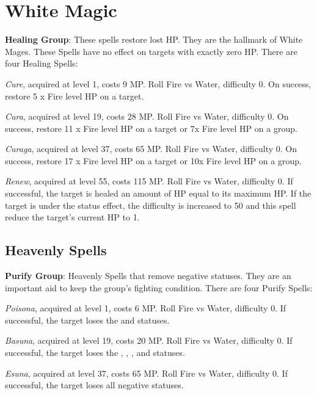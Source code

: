 \section{White Magic}\label{sec:magic-white}

\begin{multicols}{2}
	
    \textbf{Healing Group}: These spells restore lost HP\@. They are the hallmark of White Mages. These Spells have no effect on targets with exactly zero HP\@. There are four Healing Spells:

    \textit{Cure}, acquired at level 1, costs 9 MP\@. Roll Fire vs Water, difficulty 0. On success, restore 5 x Fire level HP on a target.

    \textit{Cura}, acquired at level 19, costs 28 MP\@. Roll Fire vs Water, difficulty 0. On success, restore 11 x Fire level HP on a target or 7x Fire level HP on a group.

    \textit{Curaga}, acquired at level 37, costs 65 MP\@. Roll Fire vs Water, difficulty 0. On success, restore 17 x Fire level HP on a target or 10x Fire level HP on a group.

    \textit{Renew}, acquired at level 55, costs 115 MP\@. Roll Fire vs Water, difficulty 0. If successful, the target is healed an amount of HP equal to its maximum HP\@. If the target is under the  status effect, the difficulty is increased to 50 and this spell reduce the target’s current HP to 1.\\%

    \subsection{Heavenly Spells}\label{subsec:white-heavenly}

    \textbf{Purify Group}: Heavenly Spells that remove negative statuses. They are an important aid to keep the group’s fighting condition. There are four Purify Spells:

    \textit{Poisona}, acquired at level 1, costs 6 MP\@. Roll Fire vs Water, difficulty 0. If successful, the target loses the  and  statuses.

    \textit{Basuna}, acquired at level 19, costs 20 MP\@. Roll Fire vs Water, difficulty 0. If successful, the target loses the , , ,  and  statuses.

    \textit{Esuna}, acquired at level 37, costs 65 MP\@. Roll Fire vs Water, difficulty 0. If successful, the target loses all negative statuses.


\end{multicols}
